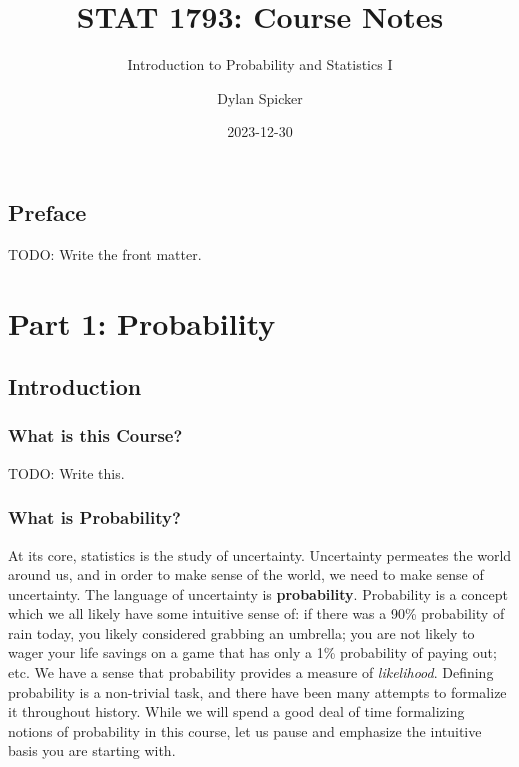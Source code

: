 \documentclass[
  letterpaper,
  DIV=11,
  numbers=noendperiod]{scrreprt}
\title{STAT 1793: Course Notes}
\subtitle{Introduction to Probability and Statistics I}
\author{Dylan Spicker}
\date{2023-12-30}
\renewcommand*\contentsname{Table of contents}
\newcommand\contentsname{Table of contents}
\begin{document}
\maketitle

\renewcommand*\contentsname{Table of contents}
{
\hypersetup{linkcolor=}
\setcounter{tocdepth}{2}
\tableofcontents
}

\chapter*{Preface}\label{preface}


TODO: Write the front matter.

\part{Part 1: Probability}

\chapter{Introduction}\label{introduction}

\section{What is this Course?}\label{what-is-this-course}

TODO: Write this.

\section{What is Probability?}\label{what-is-probability}

At its core, statistics is the study of uncertainty. Uncertainty
permeates the world around us, and in order to make sense of the world,
we need to make sense of uncertainty. The language of uncertainty is
\textbf{probability}. Probability is a concept which we all likely have
some intuitive sense of: if there was a 90\% probability of rain today,
you likely considered grabbing an umbrella; you are not likely to wager
your life savings on a game that has only a 1\% probability of paying
out; etc. We have a sense that probability provides a measure of
\emph{likelihood}. Defining probability is a non-trivial task, and there
have been many attempts to formalize it throughout history. While we
will spend a good deal of time formalizing notions of probability in
this course, let us pause and emphasize the intuitive basis you are
starting with.
\end{document}

